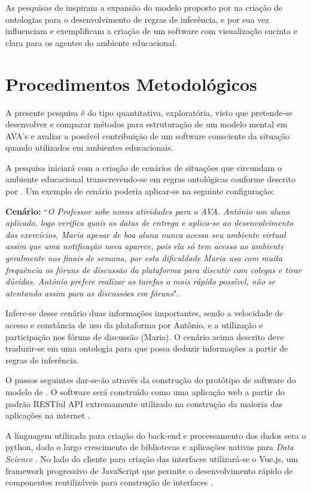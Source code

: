 \documentclass[
	oneside,
	12pt,				%
	a4paper,			%
	english,			%
	brazil,				%
	article
	]{abntex2}
\begin{document}
{As pesquisas de  inspiram a expansão do modelo proposto por  na criação de ontologias para o desenvolvimento de regras de inferência, e por sua vez  influenciam e exemplificam a criação de um software com visualização sucinta e clara para os agentes do ambiente educacional.

\section{Procedimentos Metodológicos}

A presente pesquisa é do tipo quantitativa, exploratória, visto que pretende-se desenvolver e comparar métodos para estruturação de um modelo mental em AVA's e avaliar a possível contribuição de um software consciente da situação quando utilizados em ambientes educacionais.

A pesquisa iniciará com a criação de cenários de situações que circundam o ambiente educacional transcrevendo-se em regras ontológicas conforme descrito por \cite{Kokar2009}. Um exemplo de cenário poderia aplicar-se na seguinte configuração:

\textbf{Cenário:}
``\textit{O Professor sobe novas atividades para o AVA. Antônio um aluno aplicado, logo verifica quais as datas de entrega e aplica-se ao desenvolvimento dos exercícios, Maria apesar de boa aluna nunca acessa seu ambiente virtual assim que uma notificação nova aparece, pois ela só tem acesso ao ambiente geralmente nos finais de semana, por esta dificuldade Maria usa com muita frequência os fóruns de discussão da plataforma para discutir com colegas e tirar dúvidas. Antônio prefere realizar as tarefas o mais rápido possível, não se atentando assim para as discussões em fóruns}". 

Infere-se desse cenário duas informações importantes, sendo a velocidade de acesso e constância de uso da plataforma por Antônio, e a utilização e participação nos fóruns de discussão (Maria). O cenário acima descrito deve traduzir-se em uma ontologia para que possa deduzir informações a partir de regras de inferência.

O passos seguintes dar-se-ão através da construção do protótipo de software do modelo de \cite{Martins2018}. O software será construído como uma aplicação web a partir do padrão RESTful API extremamente utilizado na construção da maioria das aplicações na internet \cite{restFulAPI}.

A linguagem utilizada para criação do back-end e processamento dos dados sera o python, dado o largo crescimento de bibliotecas e aplicações nativas para \textit{Data Science} \cite{aboutPython}. No lado do cliente para criação das interfaces utilizará-se o Vue.js, um framework progressivo de JavaScript que permite o desenvolvimento rápido de componentes reutilizáveis para construção de interfaces \cite{aboutVue}.


}
\end{document}
